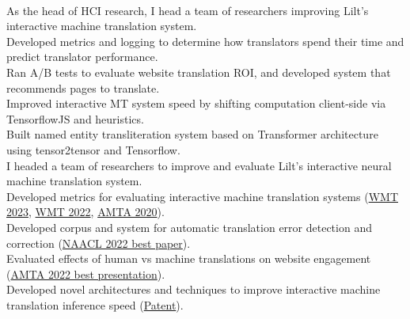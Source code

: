 \vspace{-1mm}

\\
\ifdefined\hci
As the head of HCI research, I head a team of researchers improving Lilt's interactive machine translation system.\\
Developed metrics and logging to determine how translators spend their time and predict translator performance.\\
Ran A/B tests to evaluate website translation ROI, and developed system that recommends pages to translate. \\
Improved interactive MT system speed by shifting computation client-side via TensorflowJS and heuristics.\\
Built named entity transliteration system based on Transformer architecture using tensor2tensor and Tensorflow.\\  
\else
I headed a team of researchers to improve and evaluate Lilt's interactive neural machine translation system.\\
Developed metrics for evaluating interactive machine translation systems (\href{https://aclanthology.org/2023.wmt-1.53.pdf}{WMT 2023}, \href{https://aclanthology.org/2022.wmt-1.75.pdf}{WMT 2022}, \href{https://aclanthology.org/2020.amta-impact.7/}{AMTA 2020}).\\
Developed corpus and system for automatic translation error detection and correction (\href{https://aclanthology.org/2022.naacl-main.36.pdf}{NAACL 2022 best paper}).\\
Evaluated effects of human vs machine translations on website engagement (\href{https://aclanthology.org/2022.amta-research.23.pdf}{AMTA 2022 best presentation}).\\
Developed novel architectures and techniques to improve interactive machine translation inference speed (\href{https://patents.google.com/patent/US11900073B2}{Patent}).\\
\fi

\vspace{-1mm}

